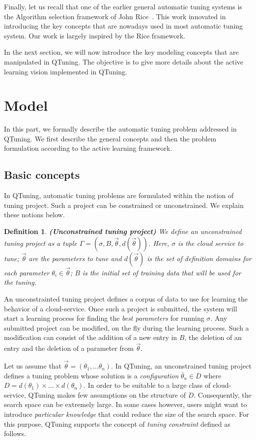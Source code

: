 \documentclass[10pt, conference, compsocconf]{IEEEtran}
\newtheorem{definition}[theorem]{Definition}
\begin{document}
Finally, let us recall that one of the earlier general automatic tuning systems
is the  Algorithm selection framework of John Rice~\cite{Rice}. This work
innovated in introducing the key concepts that are nowadays used in most
automatic tuning system. Our work is largely inspired by the Rice framework.

In the next section, we will now introduce the key modeling concepts that are
manipulated in QTuning. The objective is to give more details about the active
learning vision implemented in QTuning.

\section{Model} \label{Model}

In this part, we formally describe the automatic tuning problem addressed in QTuning. We first describe
the general concepts and then the problem formulation according to the active learning framework.
 \subsection{Basic concepts}

In QTuning, automatic tuning problems are formulated within the notion of tuning project.  Such
a project can be  constrained or unconstrained. We explain these notions below.

\begin{definition}{\bf (Unconstrained tuning project)}
We define an unconstrained tuning project as a tuple $ \Gamma = (\sigma, B, \vec{\theta}, d(\vec{\theta}))$. Here, $\sigma$ is the cloud service to tune;
$\vec{\theta}$ are the parameters to tune and $d(\vec{\theta})$ is the set of definition domains for each parameter
$\theta_i \in \vec{\theta}$; $B$ is the initial set of training data that will be used for the tuning.
\end{definition}

An unconstrainted tuning project defines a corpus of data to use for learning the behavior of a cloud-service.
Once such a project is submitted, the system will start a learning process for finding the {\it best parameters} for
running $\sigma$. Any submitted project can be modified, on the fly during the learning process. Such a modification can consist of
the addition of a new entry in $B$, the deletion of an entry and the deletion of a parameter from $\vec{\theta}$.

Let us assume that $\vec{\theta} = (\theta_1,\dots \theta_n)$. In QTuning, an unconstrained tuning project defines
a tuning problem whose solution is a {\it configuration} $\bar{\theta}_u \in D$ where $D = d(\theta_1) \times \dots  \times d(\theta_n)$.
In order to be suitable to a large class of cloud-service, QTuning makes few assumptions on the structure of $D$.
Consequently, the search space can be extremely large.
In some cases however, users might want to introduce {\it particular knowledge} that could reduce the size of the search space.
For this purpose, QTuning supports the concept of {\it tuning constraint} defined as follows.
\end{document}
